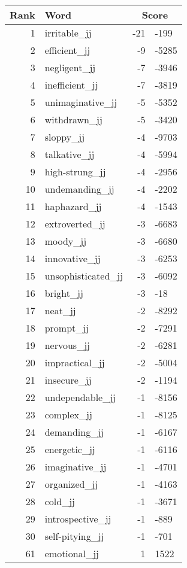 \begin{longtable}[!htbp]{| rlr@{.}l |}
    \hline
    \textbf{Rank} & \textbf{Word} & \multicolumn{2}{c|}{\textbf{Score}} \\
    \hline
    \endhead
    1 & irritable\_jj & -21 & -199 \\
    2 & efficient\_jj & -9 & -5285 \\
    3 & negligent\_jj & -7 & -3946 \\
    4 & inefficient\_jj & -7 & -3819 \\
    5 & unimaginative\_jj & -5 & -5352 \\
    6 & withdrawn\_jj & -5 & -3420 \\
    7 & sloppy\_jj & -4 & -9703 \\
    8 & talkative\_jj & -4 & -5994 \\
    9 & high-strung\_jj & -4 & -2956 \\
    10 & undemanding\_jj & -4 & -2202 \\
    11 & haphazard\_jj & -4 & -1543 \\
    12 & extroverted\_jj & -3 & -6683 \\
    13 & moody\_jj & -3 & -6680 \\
    14 & innovative\_jj & -3 & -6253 \\
    15 & unsophisticated\_jj & -3 & -6092 \\
    16 & bright\_jj & -3 & -18 \\
    17 & neat\_jj & -2 & -8292 \\
    18 & prompt\_jj & -2 & -7291 \\
    19 & nervous\_jj & -2 & -6281 \\
    20 & impractical\_jj & -2 & -5004 \\
    21 & insecure\_jj & -2 & -1194 \\
    22 & undependable\_jj & -1 & -8156 \\
    23 & complex\_jj & -1 & -8125 \\
    24 & demanding\_jj & -1 & -6167 \\
    25 & energetic\_jj & -1 & -6116 \\
    26 & imaginative\_jj & -1 & -4701 \\
    27 & organized\_jj & -1 & -4163 \\
    28 & cold\_jj & -1 & -3671 \\
    29 & introspective\_jj & -1 & -889 \\
    30 & self-pitying\_jj & -1 & -701 \\
    61 & emotional\_jj & 1 & 1522 \\

\end{longtable}
